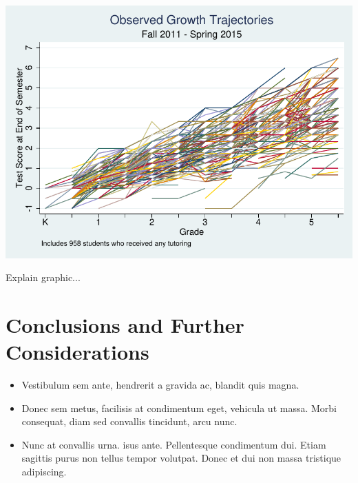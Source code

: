 \documentclass[a0,landscape]{a0poster}
\begin{document}
\begin{multicols}{3}
\begin{center}\vspace{1cm}
\includegraphics[width=0.8\linewidth]{xtline.pdf}
\end{center}\vspace{1cm}

Explain graphic...


\color{SaddleBrown} %

\section*{Conclusions and Further Considerations}

\begin{itemize}
\item Vestibulum sem ante, hendrerit a gravida ac, blandit quis magna.
\item Donec sem metus, facilisis at condimentum eget, vehicula ut massa. Morbi consequat, diam sed convallis tincidunt, arcu nunc.
\item Nunc at convallis urna. isus ante. Pellentesque condimentum dui. Etiam sagittis purus non tellus tempor volutpat. Donec et dui non massa tristique adipiscing.
\end{itemize}

\color{DarkSlateGray} %


\end{multicols}
\end{document}
